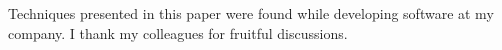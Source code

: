 \documentclass[sigplan,review]{acmart}
\begin{document}
\maketitle







\begin{acks}
Techniques presented in this paper were found while developing software at my company.
I thank my colleagues for fruitful discussions.
\end{acks}




\appendix

\end{document}
